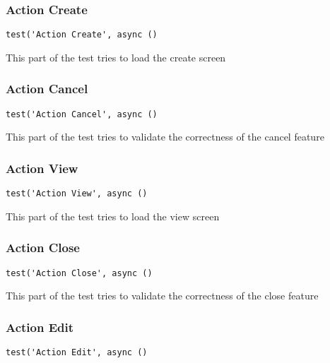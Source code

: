 \documentclass[a4paper]{article}
\begin{document}
\hypertarget{toc119}{}
\subsubsection{Action Create}

\begin{lstlisting}
test('Action Create', async ()
\end{lstlisting}

This part of the test tries to load the create screen

\hypertarget{toc120}{}
\subsubsection{Action Cancel}

\begin{lstlisting}
test('Action Cancel', async ()
\end{lstlisting}

This part of the test tries to validate the correctness of the cancel feature

\hypertarget{toc121}{}
\subsubsection{Action View}

\begin{lstlisting}
test('Action View', async ()
\end{lstlisting}

This part of the test tries to load the view screen

\hypertarget{toc122}{}
\subsubsection{Action Close}

\begin{lstlisting}
test('Action Close', async ()
\end{lstlisting}

This part of the test tries to validate the correctness of the close feature

\hypertarget{toc123}{}
\subsubsection{Action Edit}

\begin{lstlisting}
test('Action Edit', async ()
\end{lstlisting}
\end{document}
